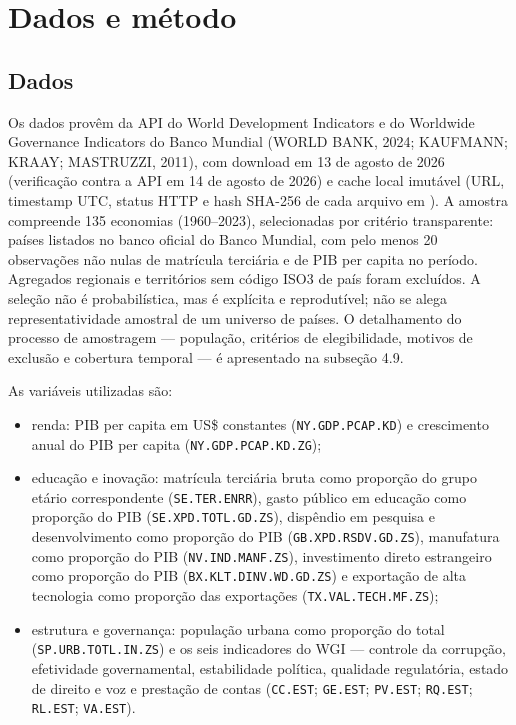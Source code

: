 \documentclass[12pt,a4paper]{article}
\begin{document}
\section{Dados e método}

\subsection{Dados}

Os dados provêm da API do World Development Indicators e do Worldwide Governance Indicators do Banco Mundial (WORLD BANK, 2024; KAUFMANN; KRAAY; MASTRUZZI, 2011), com download em 13 de agosto de 2026 (verificação contra a API em 14 de agosto de 2026) e cache local imutável (URL, timestamp UTC, status HTTP e hash SHA-256 de cada arquivo em ). A amostra compreende 135 economias (1960--2023), selecionadas por critério transparente: países listados no banco oficial do Banco Mundial, com pelo menos 20 observações não nulas de matrícula terciária e de PIB per capita no período. Agregados regionais e territórios sem código ISO3 de país foram excluídos. A seleção não é probabilística, mas é explícita e reprodutível; não se alega representatividade amostral de um universo de países. O detalhamento do processo de amostragem --- população, critérios de elegibilidade, motivos de exclusão e cobertura temporal --- é apresentado na subseção 4.9.

As variáveis utilizadas são:
\begin{itemize}\raggedright
\item renda: PIB per capita em US\$ constantes (\texttt{NY.GDP.PCAP.KD}) e crescimento anual do PIB per capita (\texttt{NY.GDP.PCAP.KD.ZG});
\item educação e inovação: matrícula terciária bruta como proporção do grupo etário correspondente (\texttt{SE.TER.ENRR}), gasto público em educação como proporção do PIB (\texttt{SE.XPD.TOTL.GD.ZS}), dispêndio em pesquisa e desenvolvimento como proporção do PIB (\texttt{GB.XPD.RSDV.GD.ZS}), manufatura como proporção do PIB (\texttt{NV.IND.MANF.ZS}), investimento direto estrangeiro como proporção do PIB (\texttt{BX.KLT.DINV.WD.GD.ZS}) e exportação de alta tecnologia como proporção das exportações (\texttt{TX.VAL.TECH.MF.ZS});
\item estrutura e governança: população urbana como proporção do total (\texttt{SP.URB.TOTL.IN.ZS}) e os seis indicadores do WGI --- controle da corrupção, efetividade governamental, estabilidade política, qualidade regulatória, estado de direito e voz e prestação de contas (\texttt{CC.EST}; \texttt{GE.EST}; \texttt{PV.EST}; \texttt{RQ.EST}; \texttt{RL.EST}; \texttt{VA.EST}).
\end{itemize}
\end{document}
